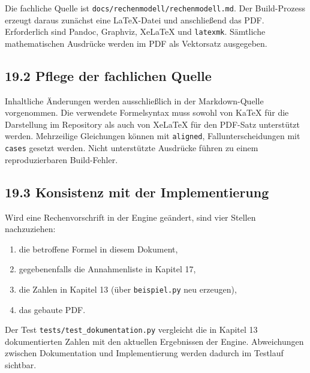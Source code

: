\documentclass[
  a4paper,
  10pt]{article}
\providecommand{\tightlist}{%
  \setlength{\itemsep}{0pt}\setlength{\parskip}{0pt}}
\begin{document}
Die fachliche Quelle ist \nolinkurl{docs/rechenmodell/rechenmodell.md}. Der
Build-Prozess erzeugt daraus zunächst eine LaTeX-Datei und anschließend
das PDF. Erforderlich sind Pandoc, Graphviz, XeLaTeX und
\texttt{latexmk}. Sämtliche mathematischen Ausdrücke werden im PDF als
Vektorsatz ausgegeben.

\hypertarget{pflege-der-fachlichen-quelle}{%
\subsection{19.2 Pflege der fachlichen
Quelle}\label{pflege-der-fachlichen-quelle}}

Inhaltliche Änderungen werden ausschließlich in der Markdown-Quelle
vorgenommen. Die verwendete Formelsyntax muss sowohl von KaTeX für die
Darstellung im Repository als auch von XeLaTeX für den PDF-Satz
unterstützt werden. Mehrzeilige Gleichungen können mit \texttt{aligned},
Fallunterscheidungen mit \texttt{cases} gesetzt werden. Nicht
unterstützte Ausdrücke führen zu einem reproduzierbaren Build-Fehler.

\hypertarget{konsistenz-mit-der-implementierung}{%
\subsection{19.3 Konsistenz mit der
Implementierung}\label{konsistenz-mit-der-implementierung}}

Wird eine Rechenvorschrift in der Engine geändert, sind vier Stellen
nachzuziehen:

\begin{enumerate}
\def\labelenumi{\arabic{enumi}.}
\tightlist
\item
  die betroffene Formel in diesem Dokument,
\item
  gegebenenfalls die Annahmenliste in Kapitel 17,
\item
  die Zahlen in Kapitel 13 (über \texttt{beispiel.py} neu erzeugen),
\item
  das gebaute PDF.
\end{enumerate}

Der Test \nolinkurl{tests/test_dokumentation.py} vergleicht die in Kapitel
13 dokumentierten Zahlen mit den aktuellen Ergebnissen der Engine.
Abweichungen zwischen Dokumentation und Implementierung werden dadurch
im Testlauf sichtbar.
\end{document}
